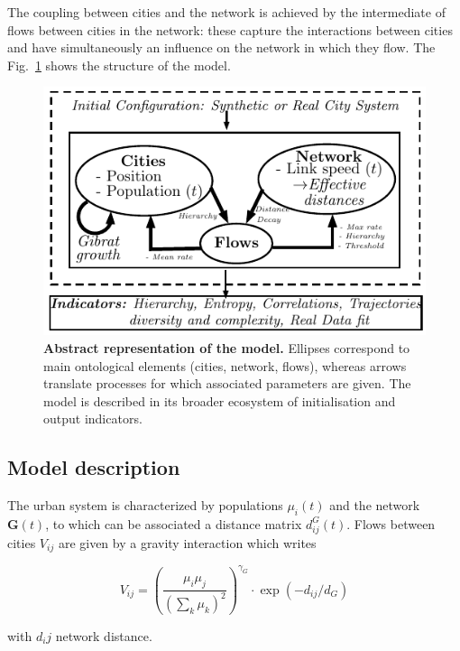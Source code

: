 The coupling between cities and the network is achieved by the intermediate of flows between cities in the network: these capture the interactions between cities and have simultaneously an influence on the network in which they flow. The Fig.~\ref{fig:macrocoevol:model} shows the structure of the model.


\begin{figure}
\includegraphics[width=\linewidth]{figures/model}
\caption[Schematic model representation]{\textbf{Abstract representation of the model.} Ellipses correspond to main ontological elements (cities, network, flows), whereas arrows translate processes for which associated parameters are given. The model is described in its broader ecosystem of initialisation and output indicators.\label{fig:macrocoevol:model}}
\end{figure}


\subsection{Model description}

The urban system is characterized by populations $\mu_i(t)$ and the network $\mathbf{G}(t)$, to which can be associated a distance matrix $d^G_{ij}(t)$. Flows between cities $V_{ij}$ are given by a gravity interaction which writes

\begin{equation}
V_{ij} = \left(\frac{\mu_i\mu_j}{\left(\sum_k{\mu_k}\right)^2}\right)^{\gamma_G}\cdot \exp{\left(-d_{ij}/d_G\right)}
\end{equation}

with $d_ij$ network distance.


